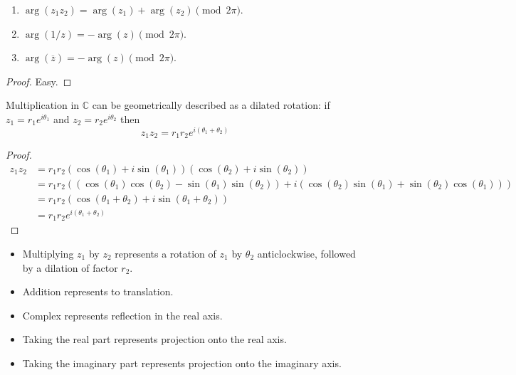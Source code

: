 \begin{lemma}
	\hfill
	\begin{enumerate}
		\item $\arg(z_1 z_2) = \arg(z_1) + \arg(z_2) \pmod{2 \pi}$.
		\item $\arg(1 / z) = -\arg(z) \pmod{2 \pi}$.
		\item $\arg(\overline{z}) = -\arg(z) \pmod{2 \pi}$.
	\end{enumerate}
\end{lemma}

\begin{proof}
	Easy.
\end{proof}

\begin{lemma}
	Multiplication in $\mathbb{C}$ can be geometrically described as a dilated rotation: if $z_1 = r_1 e^{i \theta_1}$ and $z_2 = r_2 e^{i \theta_2}$ then
	\[
		z_1 z_2 = r_1 r_2 e^{i (\theta_1 + \theta_2)}
	\]
\end{lemma}

\begin{proof}
	\[
		\begin{aligned}
			z_1 z_2
				& = r_1 r_2 (\cos(\theta_1) + i \sin(\theta_1)) (\cos(\theta_2) + i \sin(\theta_2)) \\
				& = r_1 r_2 ((\cos(\theta_1) \cos(\theta_2) - \sin(\theta_1) \sin(\theta_2)) + i (\cos(\theta_2) \sin(\theta_1) + \sin(\theta_2) \cos(\theta_1))) \\
				& = r_1 r_2 (\cos(\theta_1 + \theta_2) + i \sin(\theta_1 + \theta_2)) \\
				& = r_1 r_2 e^{i (\theta_1 + \theta_2)}
		\end{aligned}
	\]
\end{proof}

\begin{remark}
	\hfill
	\begin{itemize}
		\item Multiplying $z_1$ by $z_2$ represents a rotation of $z_1$ by $\theta_2$ anticlockwise, followed by a dilation of factor $r_2$.
		\item Addition represents to translation.
		\item Complex represents reflection in the real axis.
		\item Taking the real part represents projection onto the real axis.
		\item Taking the imaginary part represents projection onto the imaginary axis.
	\end{itemize}
\end{remark}

